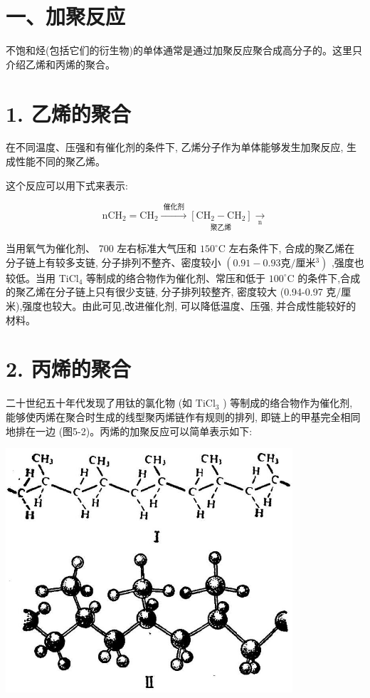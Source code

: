 \documentclass[10pt]{article}
\begin{document}
\section*{一、加聚反应}

不饱和烃(包括它们的衍生物)的单体通常是通过加聚反应聚合成高分子的。这里只介绍乙烯和丙烯的聚合。

\section*{1. 乙烯的聚合}

在不同温度、压强和有催化剂的条件下, 乙烯分子作为单体能够发生加聚反应, 生成性能不同的聚乙烯。

这个反应可以用下式来表示:

\[
{\mathrm{{nCH}}}_{2} = {\mathrm{{CH}}}_{2}\xrightarrow[]{\text{ 催化剂 }}\underset{\text{ 聚乙烯 }}{\left\lbrack {\mathrm{{CH}}}_{2} - {\mathrm{{CH}}}_{2}\right\rbrack }\xrightarrow[\mathrm{n}]{}
\]

当用氧气为催化剂、 700 左右标准大气压和 \({150}^{ \circ }\mathrm{C}\) 左右条件下, 合成的聚乙烯在分子链上有较多支链, 分子排列不整齐、密度较小 \(\left( {{0.91} - {0.93}\text{克}/\text{厘米}{}^{3}}\right)\) ,强度也较低。当用 \({\mathrm{{TiCl}}}_{4}\) 等制成的络合物作为催化剂、常压和低于 \({100}^{ \circ }\mathrm{C}\) 的条件下,合成的聚乙烯在分子链上只有很少支链, 分子排列较整齐, 密度较大 (0.94-0.97 克/厘米),强度也较大。由此可见,改进催化剂, 可以降低温度、压强, 并合成性能较好的材料。

\section*{2. 丙烯的聚合}

二十世纪五十年代发现了用钛的氯化物 (如 \({\mathrm{{TiCl}}}_{3}\) ) 等制成的络合物作为催化剂, 能够使丙烯在聚合时生成的线型聚丙烯链作有规则的排列, 即链上的甲基完全相同地排在一边 (图5-2)。丙烯的加聚反应可以简单表示如下:

\begin{center}
\includegraphics[max width=0.8\textwidth]{images/01912d16-be99-77bb-9535-4f3ed8d9946f_187_975459.jpg}
\end{center}
\end{document}
